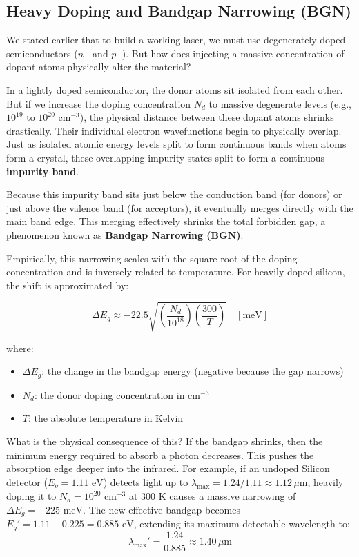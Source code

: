 \subsection{Heavy Doping and Bandgap Narrowing (BGN)}

We stated earlier that to build a working laser, we must use degenerately doped semiconductors ($n^+$ and $p^+$). But how does injecting a massive concentration of dopant atoms physically alter the material?

In a lightly doped semiconductor, the donor atoms sit isolated from each other. But if we increase the doping concentration $N_d$ to massive degenerate levels (e.g., $10^{19}$ to $10^{20}\text{ cm}^{-3}$), the physical distance between these dopant atoms shrinks drastically. Their individual electron wavefunctions begin to physically overlap. Just as isolated atomic energy levels split to form continuous bands when atoms form a crystal, these overlapping impurity states split to form a continuous \textbf{impurity band}.

Because this impurity band sits just below the conduction band (for donors) or just above the valence band (for acceptors), it eventually merges directly with the main band edge. This merging effectively shrinks the total forbidden gap, a phenomenon known as \textbf{Bandgap Narrowing (BGN)}.

Empirically, this narrowing scales with the square root of the doping concentration and is inversely related to temperature. For heavily doped silicon, the shift is approximated by:
\begin{keyresult}
    \begin{equation}
        \Delta E_g \approx -22.5\sqrt{\left(\frac{N_d}{10^{18}}\right)\left(\frac{300}{T}\right)} \quad [\text{meV}]
    \end{equation}
\end{keyresult}
where:
\begin{itemize}
    \item $\Delta E_g$: the change in the bandgap energy (negative because the gap narrows)
    \item $N_d$: the donor doping concentration in $\text{cm}^{-3}$
    \item $T$: the absolute temperature in Kelvin
\end{itemize}

What is the physical consequence of this? If the bandgap shrinks, then the minimum energy required to absorb a photon decreases. This pushes the absorption edge deeper into the infrared. For example, if an undoped Silicon detector ($E_g = 1.11\text{ eV}$) detects light up to $\lambda_{\text{max}} = 1.24/1.11 \approx 1.12\,\mu\text{m}$, heavily doping it to $N_d = 10^{20}\text{ cm}^{-3}$ at $300\text{ K}$ causes a massive narrowing of $\Delta E_g = -225\text{ meV}$. The new effective bandgap becomes $E_g' = 1.11 - 0.225 = 0.885\text{ eV}$, extending its maximum detectable wavelength to:
\begin{equation*}
    \lambda_{\text{max}}' = \frac{1.24}{0.885} \approx 1.40\,\mu\text{m}
\end{equation*}

